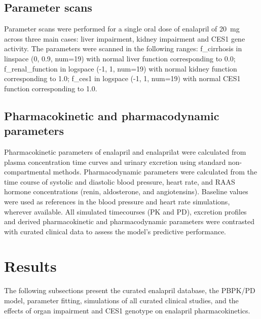 \documentclass[pharmaceutics,article,submit,pdftex,moreauthors]{Definitions/mdpi}
\begin{document}
\subsection{Parameter scans}\label{sec:methods_scans}
Parameter scans were performed for a single oral dose of enalapril of 20~mg across three main cases: liver impairment, kidney impairment and CES1 gene activity. The parameters were scanned in the following ranges: f\_cirrhosis in linspace (0, 0.9, num=19) with normal liver function corresponding to 0.0; f\_renal\_function in logspace (-1, 1, num=19) with normal kidney function corresponding to 1.0; f\_ces1 in logspace (-1, 1, num=19) with normal CES1 function corresponding to 1.0. 

\subsection{Pharmacokinetic and pharmacodynamic parameters}\label{sec:methods_pkpd_parameters}
Pharmacokinetic parameters of enalapril and enalaprilat were calculated from plasma concentration time curves and urinary excretion using standard non-compartmental methods. Pharmacodynamic parameters were calculated from the time course of systolic and diastolic blood pressure, heart rate, and RAAS hormone concentrations (renin, aldosterone, and angiotensins). Baseline values were used as references in the blood pressure and heart rate simulations, wherever available. All simulated timecourses (PK and PD), excretion profiles and derived pharmacokinetic and pharmacodynamic parameters were contrasted with curated clinical data to assess the model's predictive performance. 

\section{Results}
The following subsections present the curated enalapril database, the PBPK/PD model, parameter fitting, simulations of all curated clinical studies, and the effects of organ impairment and CES1 genotype on enalapril pharmacokinetics.
\end{document}
